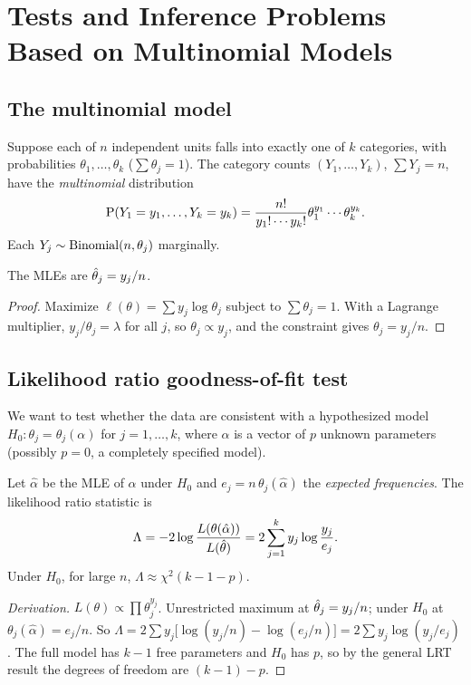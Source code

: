 \chapter{Tests and Inference Problems Based on Multinomial Models}

\section{The multinomial model}

Suppose each of $n$ independent units falls into exactly one of $k$ categories, with
probabilities $\theta_1,\dots,\theta_k$ ($\sum\theta_j = 1$). The category counts
$(Y_1,\dots,Y_k)$, $\sum Y_j = n$, have the \emph{multinomial} distribution
\[
\operatorname{P}(Y_1=y_1,\dots,Y_k=y_k) = \frac{n!}{y_1!\cdots y_k!}\theta_1^{y_1}\cdots\theta_k^{y_k}.
\]
Each $Y_j\sim\operatorname{Binomial}(n,\theta_j)$ marginally.

\begin{theorem}
The MLEs are $\hat{\theta}_j = y_j/n$.
\end{theorem}
\begin{proof}
Maximize $\ell(\theta) = \sum y_j\log\theta_j$ subject to $\sum\theta_j=1$. With a Lagrange
multiplier, $y_j/\theta_j = \lambda$ for all $j$, so $\theta_j\propto y_j$, and the constraint
gives $\theta_j = y_j/n$.
\end{proof}

\section{Likelihood ratio goodness-of-fit test}

We want to test whether the data are consistent with a hypothesized model
$H_0:\theta_j = \theta_j(\alpha)$ for $j=1,\dots,k$, where $\alpha$ is a vector of $p$
unknown parameters (possibly $p=0$, a completely specified model).

\begin{theorem}
Let $\hat\alpha$ be the MLE of $\alpha$ under $H_0$ and $e_j = n\,\theta_j(\hat\alpha)$ the
\emph{expected frequencies}. The likelihood ratio statistic is
\[
\Lambda = -2\log\frac{L(\theta(\hat\alpha))}{L(\hat{\theta})} = 2\sum_{j=1}^k y_j\log\frac{y_j}{e_j}.
\]
Under $H_0$, for large $n$, $\Lambda\approx\chi^2(k-1-p)$.
\end{theorem}
\begin{proof}[Derivation]
$L(\theta)\propto\prod\theta_j^{y_j}$. Unrestricted maximum at $\hat{\theta}_j = y_j/n$; under
$H_0$ at $\theta_j(\hat\alpha) = e_j/n$. So
$\Lambda = 2\sum y_j\big[\log(y_j/n) - \log(e_j/n)\big] = 2\sum y_j\log(y_j/e_j)$. The full
model has $k-1$ free parameters and $H_0$ has $p$, so by the general LRT result the
degrees of freedom are $(k-1)-p$.
\end{proof}

